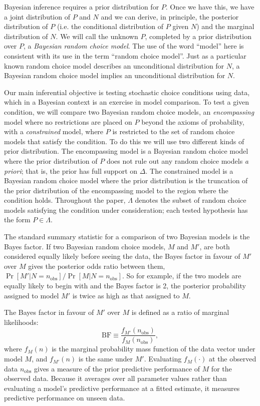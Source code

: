 \documentclass[11pt,letter]{article}
\begin{document}
Bayesian inference requires a prior distribution for $P$.
Once we have this, we have a joint distribution of $P$ and $N$ and we can derive, in principle, the posterior distribution of $P$ (i.e. the conditional distribution of $P$ given $N$) and the marginal distribution of $N$.
We will call the unknown $P$, completed by a prior distribution over $P$, a {\em Bayesian random choice model}.
The use of the word ``model'' here is consistent with its use in the term ``random choice model''.
Just as a particular known random choice model describes an unconditional distribution for $N$, a Bayesian random choice model implies an unconditional distribution for $N$.

Our main inferential objective is testing stochastic choice conditions using data, which in a Bayesian context is an exercise in model comparison.
To test a given condition, we will compare two Bayesian random choice models, an {\em encompassing} model where no restrictions are placed on $P$ beyond the axioms of probability, with a {\em constrained} model, where $P$ is restricted to the set of random choice models that satisfy the condition.
To do this we will use two different kinds of prior distribution.
The encompassing model is a Bayesian random choice model where the prior distribution of $P$ does not rule out any random choice models {\em a priori}; that is, the prior has full support on $\Delta$.
The constrained model is a Bayesian random choice model where the prior distribution is the truncation of the prior distribution of the encompassing model to the region where the condition holds.
Throughout the paper, $\Lambda$ denotes the subset of random choice models satisfying the condition under consideration; each tested hypothesis has the form \(P\in\Lambda\).

The standard summary statistic for a comparison of two Bayesian models is the Bayes factor.
If two Bayesian random choice models, $M$ and $M'$, are both considered equally likely before seeing the data, the Bayes factor in favour of $M'$ over $M$ gives the posterior odds ratio between them, $\Pr[M'|N=n_{\mathrm{obs}}]/\Pr[M|N=n_{\mathrm{obs}}]$.
So for example, if the two models are equally likely to begin with and the Bayes factor is 2, the posterior probability assigned to model $M'$ is twice as high as that assigned to $M$.

The Bayes factor in favour of $M'$ over $M$ is defined as a ratio of marginal likelihoods:
\begin{equation}
  \mathrm{BF} \equiv
  \frac{f_{M'}(n_\mathrm{obs})}{f_M(n_\mathrm{obs})},
\end{equation}
where $f_M(n)$ is the marginal probability mass function of the data vector under model $M$, and $f_{M'}(n)$ is the same under $M'$.
Evaluating $f_M(\cdot)$ at the observed data $n_\mathrm{obs}$ gives a measure of the prior predictive performance of $M$ for the observed data.
Because it averages over all parameter values rather than evaluating a model's predictive performance at a fitted estimate, it measures predictive performance on unseen data.
\end{document}
